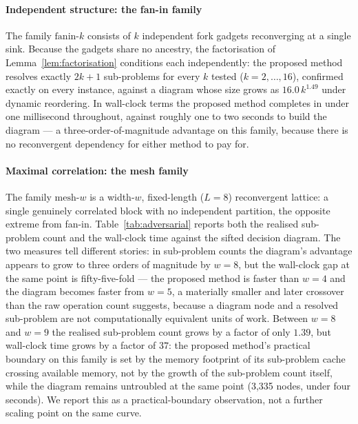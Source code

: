 \documentclass[preprint,12pt]{elsarticle}
\theoremstyle{definition}
\begin{document}
\paragraph{Independent structure: the fan-in family} The family $\mathrm{fanin}\text{-}k$ consists of $k$
independent fork gadgets reconverging at a single sink. Because the gadgets share no ancestry, the
factorisation of Lemma~\ref{lem:factorisation} conditions each independently: the proposed method resolves
exactly $2k{+}1$ sub-problems for every $k$ tested ($k=2,\dots,16$), confirmed exactly on every instance,
against a diagram whose size grows as $16.0\,k^{1.49}$ under dynamic reordering. In wall-clock terms the
proposed method completes in under one millisecond throughout, against roughly one to two seconds to build
the diagram --- a three-order-of-magnitude advantage on this family, because there is no reconvergent
dependency for either method to pay for.

\paragraph{Maximal correlation: the mesh family} The family $\mathrm{mesh}\text{-}w$ is a width-$w$,
fixed-length ($L=8$) reconvergent lattice: a single genuinely correlated block with no independent
partition, the opposite extreme from fan-in. Table~\ref{tab:adversarial} reports both the realised
sub-problem count and the wall-clock time against the sifted decision diagram. The two measures tell
different stories: in sub-problem counts the diagram's advantage appears to grow to three orders of
magnitude by $w=8$, but the wall-clock gap at the same point is fifty-five-fold --- the proposed method is
faster than $w=4$ and the diagram becomes faster from $w=5$, a materially smaller and later crossover than
the raw operation count suggests, because a diagram node and a resolved sub-problem are not computationally
equivalent units of work. Between $w=8$ and $w=9$ the realised sub-problem count grows by a factor of only
$1.39$, but wall-clock time grows by a factor of $37$: the proposed method's practical boundary on this
family is set by the memory footprint of its sub-problem cache crossing available memory, not by the
growth of the sub-problem count itself, while the diagram remains untroubled at the same point (3{,}335
nodes, under four seconds). We report this as a practical-boundary observation, not a further scaling
point on the same curve.
\end{document}
